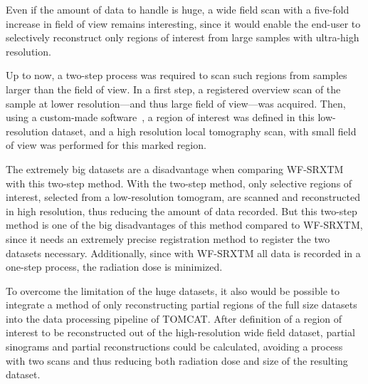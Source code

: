Even if the amount of data to handle is huge, a wide field scan with a five-fold increase in field of view remains interesting, since it would enable the end-user to selectively reconstruct only regions of interest from large samples with ultra-high resolution.

Up to now, a two-step process was required to scan such regions from samples larger than the field of view. In a first step, a registered overview scan of the sample at lower resolution---and thus large field of view---was acquired. Then, using a custom-made software~\cite{Heinzer2008}, a region of interest was defined in this low-resolution dataset, and a high resolution local tomography scan, with small field of view was performed for this marked region.

The extremely big datasets are a disadvantage when comparing WF-SRXTM with this two-step method. With the two-step method, only selective regions of interest, selected from a low-resolution tomogram, are scanned and reconstructed in high resolution, thus reducing the amount of data recorded. But this two-step method is one of the big disadvantages of this method compared to WF-SRXTM, since it needs an extremely precise registration method to register the two datasets necessary. Additionally, since with WF-SRXTM all data is recorded in a one-step process, the radiation dose is minimized. 

To overcome the limitation of the huge datasets, it also would be possible to integrate a method of only reconstructing partial regions of the full size datasets into the data processing pipeline of TOMCAT. After definition of a region of interest to be reconstructed out of the high-resolution wide field dataset, partial sinograms and partial reconstructions could be calculated, avoiding a process with two scans and thus reducing both radiation dose and size of the resulting dataset.